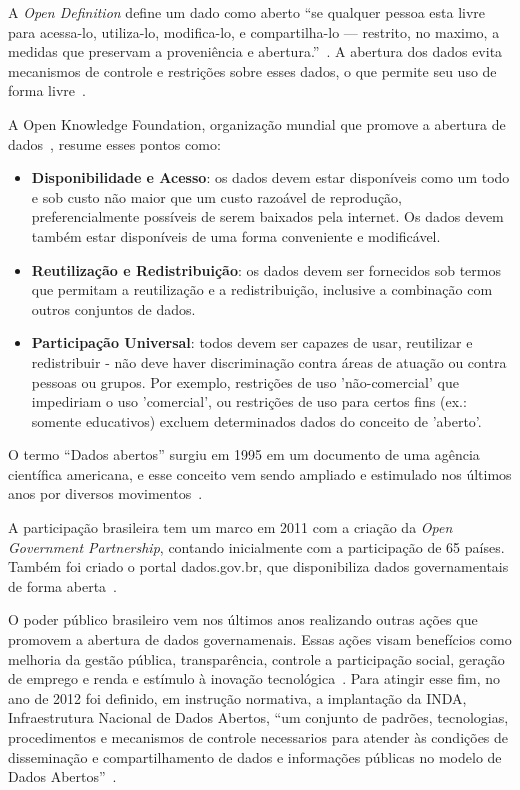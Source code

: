 A \emph{Open Definition} define um dado como aberto \enquote{se qualquer pessoa esta livre para acessa-lo, utiliza-lo, modifica-lo, e compartilha-lo — restrito, no maximo, a medidas que preservam a proveniência e abertura.}~\cite{opendefinition}. A abertura dos dados evita mecanismos de controle e restrições sobre esses dados, o que permite seu uso de forma livre~\cite{seijiconectados}.

A Open Knowledge Foundation, organização mundial que promove a abertura de dados~\cite{openknowledge}, resume esses pontos como:

\begin{itemize}
\item \textbf{Disponibilidade e Acesso}: os dados devem estar disponíveis como um todo e sob custo não maior que um custo razoável de reprodução, preferencialmente possíveis de serem baixados pela internet. Os dados devem também estar disponíveis de uma forma conveniente e modificável.

\item \textbf{Reutilização e Redistribuição}: os dados devem ser fornecidos sob termos que permitam a reutilização e a redistribuição, inclusive a combinação com outros conjuntos de dados.

\item \textbf{Participação Universal}: todos devem ser capazes de usar, reutilizar e redistribuir - não deve haver discriminação contra áreas de atuação ou contra pessoas ou grupos. Por exemplo, restrições de uso 'não-comercial' que impediriam o uso 'comercial', ou restrições de uso para certos fins (ex.: somente educativos) excluem determinados dados do conceito de 'aberto'.
\end{itemize}

O termo \enquote{Dados abertos} surgiu em 1995 em um documento de uma agência científica americana, e esse conceito vem sendo ampliado e estimulado nos últimos anos por diversos movimentos~\cite{seijiconectados}. 

A participação brasileira tem um marco em 2011 com a criação da \emph{Open Government Partnership}, contando inicialmente com a participação de 65 países. Também foi criado o portal dados.gov.br, que disponibiliza dados governamentais de forma aberta~\cite{seijiconectados}.


O poder público brasileiro vem nos últimos anos realizando outras ações que promovem a abertura de dados governamenais. Essas ações visam benefícios como melhoria da gestão pública, transparência, controle a participação social, geração de emprego e renda e estímulo à inovação tecnológica~\cite{tcu}. Para atingir esse fim, no ano de 2012 foi definido, em instrução normativa, a implantação da INDA, Infraestrutura Nacional de Dados Abertos, \enquote{um conjunto de padrões, tecnologias, procedimentos e mecanismos de controle necessarios para atender às condições de disseminação e compartilhamento de dados e informações públicas no modelo de Dados Abertos}~\cite{inda}.  

